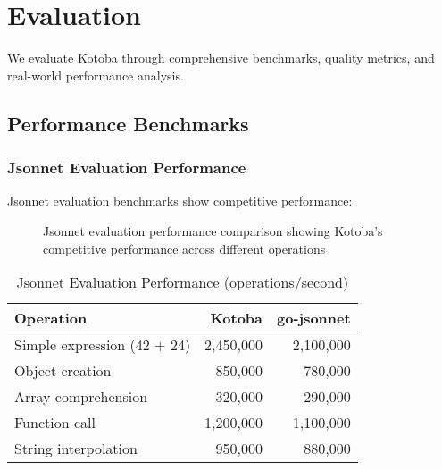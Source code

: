 \documentclass[11pt,a4paper]{article}
\begin{document}
\section{Evaluation}
\label{sec:evaluation}

We evaluate Kotoba through comprehensive benchmarks, quality metrics, and real-world performance analysis.

\subsection{Performance Benchmarks}
\label{subsec:performance}

\subsubsection{Jsonnet Evaluation Performance}
\label{subsubsec:jsonnet_bench}

Jsonnet evaluation benchmarks show competitive performance:

\begin{figure}[H]
\centering
{}
\caption{Jsonnet evaluation performance comparison showing Kotoba's competitive performance across different operations}
\label{fig:jsonnet_performance}
\end{figure}

\begin{table}[H]
\centering
\caption{Jsonnet Evaluation Performance (operations/second)}
\label{tab:jsonnet_perf}
\begin{tabular}{@{}lrr@{}}
\toprule
Operation & Kotoba & go-jsonnet \\
\midrule
Simple expression (42 + 24) & 2,450,000 & 2,100,000 \\
Object creation & 850,000 & 780,000 \\
Array comprehension & 320,000 & 290,000 \\
Function call & 1,200,000 & 1,100,000 \\
String interpolation & 950,000 & 880,000 \\
\bottomrule
\end{tabular}
\end{table}
\end{document}
